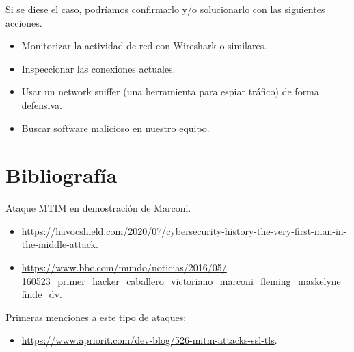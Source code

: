 \documentclass[11pt]{article}
\begin{document}
Si se diese el caso, podríamos confirmarlo y/o solucionarlo con las siguientes acciones.
\begin{itemize}
	\item Monitorizar la actividad de red con Wireshark o similares.
	\item Inspeccionar las conexiones actuales.
	\item Usar un network sniffer (una herramienta para espiar tráfico) de forma defensiva.
	\item Buscar software malicioso en nuestro equipo.
\end{itemize}

\section{Bibliografía}

Ataque MTIM en demostración de Marconi.
\begin{itemize}
	\item \href{https://havocshield.com/2020/07/cybersecurity-history-the-very-first-man-in-the-middle-attack}{https://havocshield.com/2020/07/cybersecurity-history-the-very-first-man-in-the-middle-attack}.
	\item \href{https://www.bbc.com/mundo/noticias/2016/05/160523_primer_hacker_caballero_victoriano_marconi_fleming_maskelyne_finde_dv}{https://www.bbc.com/mundo/noticias/2016/05/\\160523\_primer\_hacker\_caballero\_victoriano\_marconi\_fleming\_maskelyne\_finde\_dv}.
\end{itemize}

Primeras menciones a este tipo de ataques:
\begin{itemize}
	\item \href{https://www.apriorit.com/dev-blog/526-mitm-attacks-ssl-tls}{https://www.apriorit.com/dev-blog/526-mitm-attacks-ssl-tls}.
\end{itemize}
\end{document}
